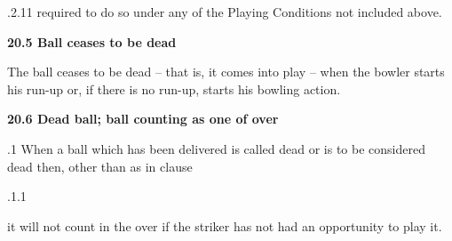 \documentclass[12pt]{article}
\begin{document}
\vspace{\baselineskip}
\begin{adjustwidth}{0.49in}{0.0in}
{\fontsize{9pt}{10.8pt}.2.11 \tabto{1.17in} required to do so under any of the Playing Conditions not included above.\par}\par

\end{adjustwidth}


\vspace{\baselineskip}
{\fontsize{11pt}{13.2pt}\selectfont \textbf{20.5 \tabto{0.47in} Ball ceases to be dead}\par}\par


\vspace{\baselineskip}
\begin{adjustwidth}{0.0in}{0.18in}
{\fontsize{9pt}{10.8pt}\selectfont The ball ceases to be dead – that is, it comes into play – when the bowler starts his run-up or, if there is no run-up, starts his bowling action.\par}\par

\end{adjustwidth}


\vspace{\baselineskip}
{\fontsize{11pt}{13.2pt}\selectfont \textbf{20.6 \tabto{0.47in} Dead ball; ball counting as one of over}\par}\par


\vspace{\baselineskip}
\begin{adjustwidth}{0.5in}{0.35in}
{\fontsize{9pt}{10.8pt}.1 \tabto{0.49in} When a ball which has been delivered is called dead or is to be considered dead then, other than as in clause \par}\par

\end{adjustwidth}


\vspace{\baselineskip}
\begin{adjustwidth}{0.49in}{0.0in}
{\fontsize{9pt}{10.8pt}.1.1 \tabto{1.17in} {\fontsize{8pt}{9.6pt}\selectfont it will not count in the over if the striker has not had an opportunity to play it.\par}\par}\par

\end{adjustwidth}
\end{document}
